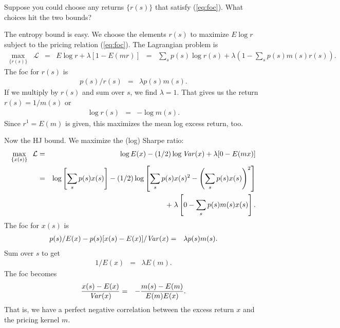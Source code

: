 \documentclass[11pt]{article}
\newcommand{\var}{\mbox{\it Var\/}}
\begin{document}
Suppose you could choose any returns $\{ r(s) \}$
that satisfy (\ref{eq:foc}).
What choices hit the two bounds?

The entropy bound is easy.  We choose the elements $r(s)$ to maximize
$ E \log r$ subject to the pricing relation (\ref{eq:foc}).
The Lagrangian problem is
\begin{eqnarray*}
    \max_{\{ r(s) \}} \;\; \mathcal{L} &=&  E \log r + \lambda [1 - E(mr)]
            \;\;=\;\; \sum_s p(s) \log r(s)
        + \lambda \left(  1 - \sum_s p(s) m(s) r(s) \right) .
\end{eqnarray*}
The foc for $r(s)$ is
\begin{eqnarray*}
    p(s)/r(s) &=& \lambda p(s) m(s) .
\end{eqnarray*}
If we multiply by $r(s)$ and sum over $s$, we find $\lambda = 1$.
That gives us the return $r(s) = 1/m(s)$
or
\begin{eqnarray*}
     \log r(s) &=& - \log m(s) .
\end{eqnarray*}
Since $r^1 = E(m)$ is given, this maximizes the mean log excess return, too.

Now the HJ bound.
We maximize the (log) Sharpe ratio:
\begin{eqnarray*}
    \max_{\{ x(s) \}} \;\; \mathcal{L}
        &=& \log E(x) - (1/2) \log \var(x) + \lambda [0 - E(mx)] \\
        &=& \log \left[ \sum_s p(s) x(s) \right] - (1/2)
        \log \left[ \sum_s p(s) x(s)^2 -
                \left(\sum_s p(s) x(s)\right)^2 \right] \\
        && + \; \lambda \left[  0 - \sum_s p(s) m(s) x(s) \right] .
\end{eqnarray*}
The foc for $x(s)$ is
\begin{eqnarray*}
    p(s)/E(x)- p(s) [x(s) - E(x)]/\var(x)  &=& \lambda p(s) m(s) .
\end{eqnarray*}
Sum over $s$ to get
\begin{eqnarray*}
    1/E(x)  &=& \lambda E(m) .
\end{eqnarray*}
The foc becomes
\begin{eqnarray}
    \frac{x(s) - E(x)}{\var(x)} &=& -
                \frac{m(s) - E(m)}{E(m)E(x)} .
                \label{eq:xs-hj-prelim}
\end{eqnarray}
That is, we have a perfect negative correlation between the
excess return $x$ and the pricing kernel $m$.
\end{document}
